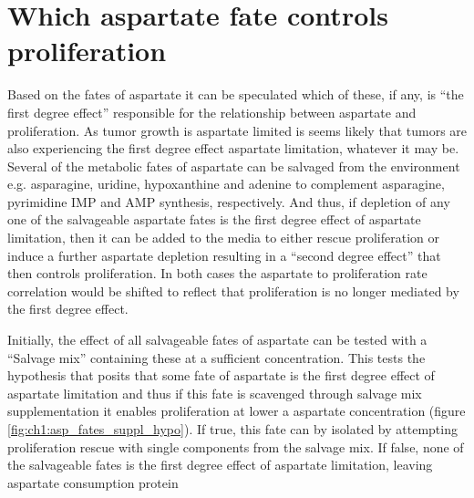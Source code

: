 \section{Which aspartate fate controls proliferation}
Based on the fates of aspartate it can be speculated which of these, if any, is ``the first degree effect'' responsible for the relationship between aspartate and proliferation.
As tumor growth is aspartate limited is seems likely that tumors are also experiencing the first degree effect aspartate limitation, whatever it may be.
Several of the metabolic fates of aspartate can be salvaged from the environment e.g. asparagine, uridine, hypoxanthine and adenine to complement asparagine, pyrimidine IMP and AMP synthesis, respectively.
And thus, if depletion of any one of the salvageable aspartate fates is the first degree effect of aspartate limitation, then it can be added to the media to either rescue proliferation or induce a further aspartate depletion resulting in a ``second degree effect'' that then controls proliferation.
In both cases the aspartate to proliferation rate correlation would be shifted to reflect that proliferation is no longer mediated by the first degree effect.

Initially, the effect of all salvageable fates of aspartate can be tested with a ``Salvage mix'' containing these at a sufficient concentration.
This tests the hypothesis that posits that some fate of aspartate is the first degree effect of aspartate limitation and thus if this fate is scavenged through salvage mix supplementation it enables proliferation at lower a aspartate concentration (figure \ref{fig:ch1:asp_fates_suppl_hypo}).
If true, this fate can by isolated by attempting proliferation rescue with single components from the salvage mix.
If false, none of the salvageable fates is the first degree effect of aspartate limitation, leaving aspartate consumption protein 

